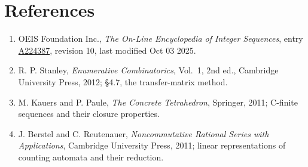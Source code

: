 \documentclass[11pt]{article}
\theoremstyle{definition}
\begin{document}
\section{References}

\begin{enumerate}

\item OEIS Foundation Inc., \emph{The On-Line Encyclopedia of Integer Sequences}, entry \href{https://oeis.org/A224387}{A224387}, revision 10, last modified Oct 03 2025.

\item R. P. Stanley, \emph{Enumerative Combinatorics}, Vol.~1, 2nd ed., Cambridge University Press, 2012; \S4.7, the transfer-matrix method.

\item M. Kauers and P. Paule, \emph{The Concrete Tetrahedron}, Springer, 2011; C-finite sequences and their closure properties.

\item J. Berstel and C. Reutenauer, \emph{Noncommutative Rational Series with Applications}, Cambridge University Press, 2011; linear representations of counting automata and their reduction.

\end{enumerate}
\end{document}
